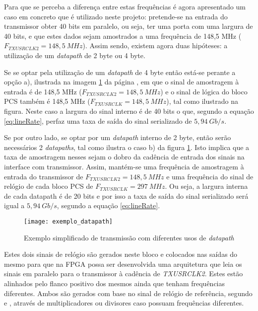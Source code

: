 Para que se perceba a diferença entre estas frequências é agora apresentado um caso em concreto que é utilizado neste projeto: pretende-se na entrada do transmissor obter 40 bits em paralelo, ou seja, ter uma porta com uma largura de 40 bits, e que estes dados sejam amostrados a uma frequência de 148,5 MHz ($F_{TXUSRCLK2} = 148,5\ MHz$). Assim sendo, existem agora duas hipóteses: a utilização de um \textit{datapath} de 2 byte ou 4 byte.

Se se optar pela utilização de um \textit{datapath} de 4 byte então está-se perante a opção a), ilustrada na imagem \ref{fig:exemplo_datapaths} da página \pageref{fig:exemplo_datapaths}, em que o sinal de amostragem à entrada é de 148,5 MHz ($F_{TXUSRCLK2} = 148,5\ MHz$) e o sinal de lógica do bloco PCS também é 148,5 MHz ($F_{TXUSRCLK} = 148,5\ MHz$), tal como ilustrado na figura. Neste caso a largura do sinal interno é de 40 bits o que, segundo a equação \ref{eq:lineRate}, perfaz uma taxa de saída do sinal serializado de $5,94\ Gb/s$.

Se por outro lado, se optar por um \textit{datapath} interno de 2 byte, então serão necessários 2 \textit{datapaths}, tal como ilustra o caso b) da figura \ref{fig:exemplo_datapaths}. Isto implica que a taxa de amostragem nesses sejam o dobro da cadência de entrada dos sinais na interface com transmissor. Assim, mantém-se uma frequência de amostragem à entrada do transmissor de $F_{TXUSRCLK2} = 148,5\ MHz$ e uma frequência do sinal de relógio de cada bloco PCS de $F_{TXUSRCLK} = 297\ MHz$. Ou seja, a largura interna de cada datapath é de 20 bits e por isso a taxa de saída do sinal serializado será igual a $5,94\ Gb/s$, segundo a equação \ref{eq:lineRate}.

\begin{figure}[h!]
 	\begin{center}
 		\leavevmode
 		\texttt{[image: exemplo\_datapath]}
 		\caption[Exemplo simplificado de transmissão com diferentes usos de \textit{datapath}]{Exemplo simplificado de transmissão com diferentes usos de \textit{datapath}}
 		\label{fig:exemplo_datapaths}
 	\end{center}
 \end{figure}

Estes dois sinais de relógio são gerados neste bloco e colocados nas saídas do mesmo para que na FPGA possa ser desenvolvida uma arquitetura que leia os sinais em paralelo para o transmissor à cadência de \textit{TXUSRCLK2}. Estes estão alinhados pelo flanco positivo dos mesmos ainda que tenham frequências diferentes. Ambos são gerados com base no sinal de relógio de referência, segundo \cite{R011} e \cite{R022}, através de multiplicadores ou divisores caso possuam frequências diferentes.


